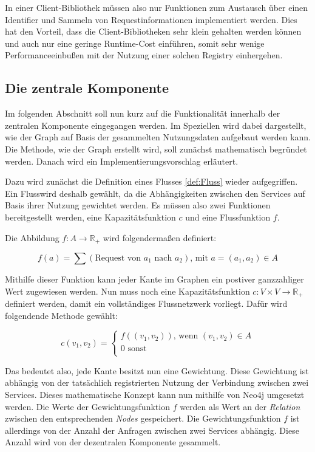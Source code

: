 In einer Client-Bibliothek müssen also nur Funktionen zum Austausch über einen Identifier und Sammeln von Requestinformationen implementiert werden. Dies hat den Vorteil, dass die Client-Bibliotheken sehr klein gehalten werden können und auch nur eine geringe Runtime-Cost einführen, somit sehr wenige Performanceeinbußen mit der Nutzung einer solchen Registry einhergehen.

\subsection{Die zentrale Komponente}

Im folgenden Abschnitt soll nun kurz auf die Funktionalität innerhalb der zentralen Komponente eingegangen werden. Im Speziellen wird dabei dargestellt, wie der Graph auf Basis der gesammelten Nutzungsdaten aufgebaut werden kann. Die Methode, wie der Graph erstellt wird, soll zunächst mathematisch begründet werden. Danach wird ein Implementierungsvorschlag erläutert.

Dazu wird zunächst die Definition eines Flusses \vref{def:Fluss} wieder aufgegriffen. Ein Flusswird deshalb gewählt, da die Abhängigkeiten zwischen den Services auf Basis ihrer Nutzung gewichtet werden. Es müssen also zwei Funktionen bereitgestellt werden, eine Kapazitätsfunktion $c$ und eine Flussfunktion $f$.

Die Abbildung $f: A \rightarrow \mathbb{R_+}$ wird folgendermaßen definiert:

\begin{equation*}
	f(a) = \sum (\text{Request von } a_1 \text{ nach } a_2) \text{, mit } a = (a_1, a_2) \in A
\end{equation*}

Mithilfe dieser Funktion kann jeder Kante im Graphen ein postiver ganzzahliger Wert zugewiesen werden. Nun muss noch eine Kapazitätsfunktion $c: V \times V \rightarrow \mathbb{R_+}$ definiert werden, damit ein vollständiges Flussnetzwerk vorliegt. Dafür wird folgendende Methode gewählt:

\begin{equation*}
	c(v_1,v_2) = \begin{cases}
		f((v_1,v_2)) \text{, wenn } (v_1,v_2) \in A\\
		0 \text{ sonst } \\
	\end{cases}
\end{equation*}

Das bedeutet also, jede Kante besitzt nun eine Gewichtung. Diese Gewichtung ist abhängig von der tatsächlich registrierten Nutzung der Verbindung zwischen zwei Services. Dieses mathematische Konzept kann nun mithilfe von Neo4j umgesetzt werden. Die Werte der Gewichtungsfunktion $f$ werden als Wert an der \textit{Relation} zwischen den entsprechenden \textit{Nodes} gespeichert. Die Gewichtungsfunktion $f$ ist allerdings von der Anzahl der Anfragen zwischen zwei Services abhängig. Diese Anzahl wird von der dezentralen Komponente gesammelt. 

